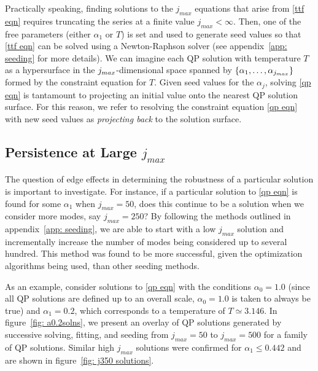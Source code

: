 \documentclass[../PhD.tex]{subfiles}
\begin{document}
Practically speaking, finding solutions to the $j_{max}$ equations that arise from \eqref{ttf eqn} requires truncating the series at a finite value $j_{max} < \infty$. Then, one of the free parameters (either $\alpha_1$ or $T$) is set and used to generate seed values so that \eqref{ttf eqn} can be solved using a Newton-Raphson solver (see appendix~\ref{app: seeding} for more details). We can imagine each QP solution with temperature $T$ as a hypersurface in the $j_{max}$-dimensional space spanned by $\{\alpha_1, \ldots, \alpha_{j_{max}} \}$ formed by the constraint equation for $T$. Given seed values for the $\alpha_j$, solving \eqref{qp eqn} is tantamount to projecting an initial value onto the nearest QP solution surface. For this reason, we refer to resolving the constraint equation \eqref{qp eqn} with new seed values as \emph{projecting back} to the solution surface.


\subsection{Persistence at Large $j_{max}$}
\label{ssec: large jmax}

The question of edge effects in determining the robustness of a particular solution is important to investigate. For instance, if a particular solution to \eqref{qp eqn} is found for some $\alpha_1$ when $j_{max} = 50$, does this continue to be a solution when we consider more modes, say $j_{max} = 250$? By following the methods outlined in appendix~\ref{app: seeding}, we are able to start with a low $j_{max}$ solution and incrementally increase the number of modes being considered up to several hundred. This method was found to be more successful, given the optimization algorithms being used, than other seeding methods.

As an example, consider solutions to \eqref{qp eqn} with the conditions $\alpha_0 = 1.0$ (since all QP solutions are defined up to an overall scale, $\alpha_0 = 1.0$ is taken to always be true) and $\alpha_1 = 0.2$, which corresponds to a temperature of $T \simeq 3.146$. In figure~\ref{fig: a0.2solns}, we present an overlay of QP solutions generated by successive solving, fitting, and seeding from $j_{max} = 50$ to $j_{max}=500$ for a family of QP solutions. Similar high $j_{max}$ solutions were confirmed for $\alpha_1 \leq 0.442$ and are shown in figure~\ref{fig: j350 solutions}.
\end{document}
